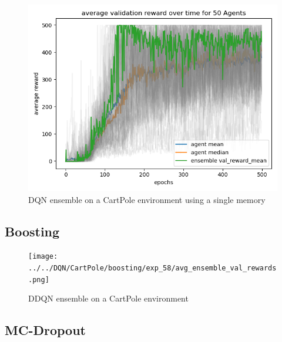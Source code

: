 \documentclass[11pt,a4paper]{article}
\begin{document}
	\begin{figure}
		\label{fig:ddqn_cartpole_ensemble_single}
		\centering
		\includegraphics[width=0.8\linewidth]{../../dqn/cartpole/single_memory_ensemble/exp_55/avg_ensemble_val_rewards.png}
		\caption{DQN ensemble on a CartPole environment using a single memory}
	\end{figure}

	\subsection{Boosting} \label{subsec:boosting}
	\begin{figure}
		\label{fig:dqn_cartpole_boosting}
		\centering
		\texttt{[image: ../../DQN/CartPole/boosting/exp\_58/avg\_ensemble\_val\_rewards.png]}
		\caption{DDQN ensemble on a CartPole environment}
	\end{figure}
	
	\subsection{MC-Dropout}\label{subsec:mc-dropout2}

	

	

	
	
\end{document}

